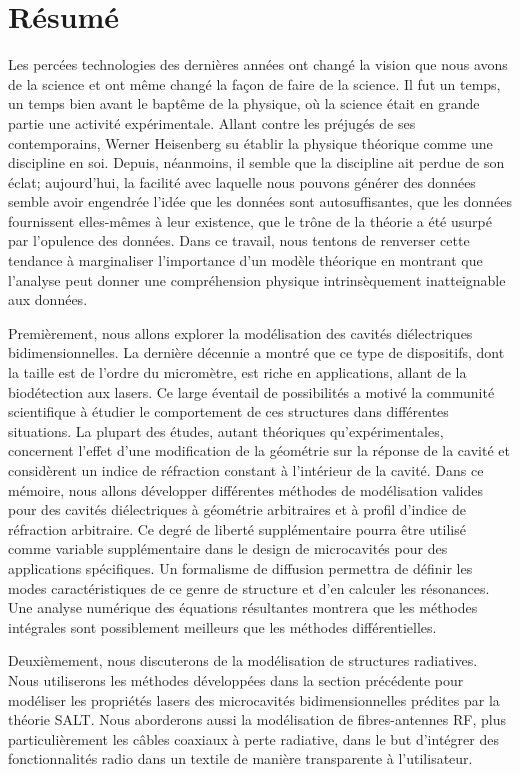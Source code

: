 \chapter*{Résumé}
Les percées technologies des dernières années ont changé
la vision que nous avons de la science et ont même changé
la façon de faire de la science. Il fut un temps, un temps
bien avant le baptême de la physique, où la science était
en grande partie une activité expérimentale. Allant 
contre les préjugés de ses contemporains, Werner
Heisenberg su établir la physique théorique comme une
discipline en soi. Depuis, néanmoins, il semble que la
discipline ait perdue de son éclat; aujourd'hui, la facilité
avec laquelle nous pouvons générer des données semble avoir
engendrée l'idée que les données sont autosuffisantes, 
que les données fournissent elles-mêmes à leur existence, 
que le trône de la théorie a été usurpé par l'opulence
des données. Dans ce travail, nous tentons de renverser
cette tendance à marginaliser l'importance d'un modèle 
théorique en montrant que l'analyse peut donner une 
compréhension physique intrinsèquement inatteignable 
aux données. 

Premièrement, nous allons explorer la modélisation des
cavités diélectriques bidimensionnelles. La dernière
décennie a montré que ce type de dispositifs, dont la 
taille est de l'ordre du micromètre, est riche en applications, 
allant de la biodétection aux lasers. Ce large éventail de
possibilités a motivé la communité scientifique à étudier
le comportement de ces structures dans différentes situations.
La plupart des études, autant théoriques qu'expérimentales, 
concernent l'effet d'une modification de la géométrie 
sur la réponse de la cavité et considèrent un 
indice de réfraction constant à l'intérieur de la cavité. 
Dans ce mémoire, nous allons développer différentes méthodes
de modélisation valides pour des cavités diélectriques à géométrie
arbitraires et à profil d'indice de réfraction arbitraire. Ce
degré de liberté supplémentaire pourra être utilisé comme variable
supplémentaire dans le design de microcavités pour des applications
spécifiques. 
Un formalisme de diffusion permettra de définir les modes caractéristiques
de ce genre de structure et d'en calculer les résonances. Une analyse
numérique des équations résultantes montrera que les méthodes intégrales
sont possiblement meilleurs que les méthodes différentielles.

Deuxièmement, nous discuterons de la modélisation de structures
radiatives. Nous utiliserons les méthodes développées dans la section
précédente pour modéliser les propriétés lasers des microcavités
bidimensionnelles prédites par la théorie SALT. Nous aborderons
aussi la modélisation de fibres-antennes RF, plus particulièrement
les câbles coaxiaux à perte radiative, dans le but d'intégrer
des fonctionnalités radio dans un textile de manière transparente
à l'utilisateur. 